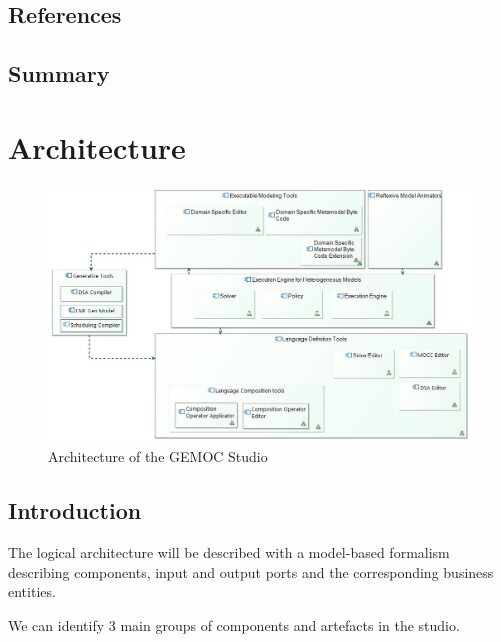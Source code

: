 \documentclass{gemoc} %
\begin{document}
\section{References}


\section{Summary}

 
\chapter{Architecture}
\begin{figure}[bt]
	\begin{center}
	\includegraphics*[trim=0.0cm 0.0cm 0cm 0.0cm, clip=true, width=1.0\linewidth]{../images/Global View.jpg}
	\caption{Architecture of the GEMOC Studio}
	\label{fig:GlobalView}
	\end{center}
\end{figure}

\section{Introduction}
The logical architecture will be described with a model-based formalism describing components, input and output ports and the corresponding business entities.

We can identify 3 main groups of components and artefacts in the studio.
\end{document}
